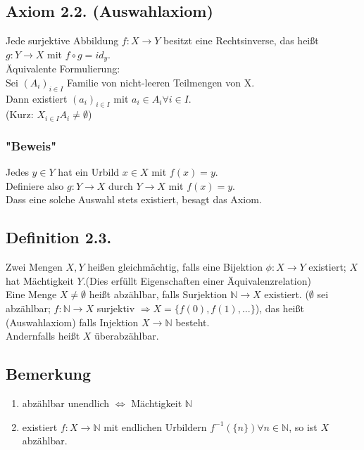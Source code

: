 \documentclass[a4paper, 12pt]{extarticle}
\begin{document}
\subsection*{Axiom 2.2. (Auswahlaxiom)}
Jede surjektive Abbildung $f: X \rightarrow Y$ besitzt eine Rechtsinverse, das heißt \\
$g: Y \rightarrow X$ mit $f \circ g = id_y$.\\
Äquivalente Formulierung:\\
Sei $(A_i)_{i \in I}$ Familie von nicht-leeren Teilmengen von X.\\
Dann existiert $(a_i)_{i \in I}$ mit $a_i \in A_i \forall i \in I$.\\
(Kurz: $X_{i \in I} A_i \neq \emptyset $)
\subsubsection*{"Beweis"}
Jedes $y \in Y$ hat ein Urbild $x \in X$ mit $f(x) = y$.\\
Definiere also $g: Y \rightarrow X$ durch $Y \rightarrow X$ mit $f(x) = y$.\\
Dass eine solche Auswahl stets existiert, besagt das Axiom.

\subsection*{Definition 2.3.}
Zwei Mengen $X,Y$ heißen gleichmächtig, falls eine Bijektion $\phi: X \rightarrow Y$ existiert; $X$ hat Mächtigkeit $Y$.(Dies erfüllt Eigenschaften einer Äquivalenzrelation)\\
Eine Menge $X \neq \emptyset$ heißt abzählbar, falls Surjektion $\mathbb{N} \rightarrow X$ existiert. ($\emptyset$ sei abzählbar; $f: \mathbb{N} \rightarrow X$ surjektiv $\Rightarrow X = \{f(0), f(1), ...\}$), das heißt (Auswahlaxiom) falls  Injektion $X \rightarrow \mathbb{N}$ besteht.\\
Andernfalls heißt $X$ überabzählbar.

\subsection*{Bemerkung}
\begin{enumerate}[label=(\arabic*)]
\item abzählbar unendlich  $\Leftrightarrow$ Mächtigkeit $\mathbb{N}$
\item existiert $f: X \rightarrow \mathbb{N}$ mit endlichen Urbildern $f^{-1}(\{n\}) \forall n\in \mathbb{N}$, so ist $X$ abzählbar.
\end{enumerate}
\end{document}
